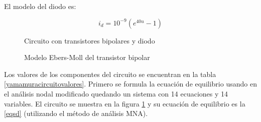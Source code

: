 \documentclass[conference,letterpaper,onecolumn]{IEEEtran}
\begin{document}
{El modelo del diodo es:

\begin{displaymath}
i_d=10^{-9}(e^{40u} - 1)
\end{displaymath}




\begin{figure}[tbp]
\centerline{
\epsfxsize=110mm
}
\caption{Circuito con transistores bipolares y diodo}
\label{yamamuracircuito}
\end{figure}



\begin{figure}[hbtp]
\centerline{
\epsfxsize=36mm
}
\caption{Modelo Ebers-Moll del transistor bipolar}
\label{FEbersMoll}
\end{figure}


Los valores de los componentes del circuito se encuentran en la tabla \ref{yamamuracircuitovalores}.
Primero se formula la ecuaci\'on de equilibrio usando en el an\'alisis nodal modificado
quedando un sistema con 14 ecuaciones y 14 variables. 
El circuito se muestra en la figura \ref{yamamuracircuito} y su ecuaci\'on de equilibrio es la \ref{eqsd} (utilizando el m\'etodo de an\'alisis MNA).



\begin{table}[hbtp]
\caption{Componentes del circuito}
\label{yamamuracircuitovalores}
\end{table}



}
\end{document}
